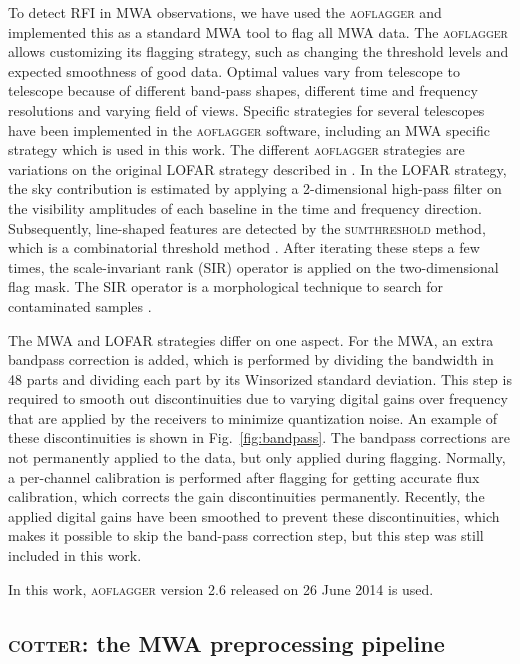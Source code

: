 \documentclass{pasa}
\begin{document}
To detect RFI in MWA observations, we have used the \textsc{aoflagger} and implemented this as a standard MWA tool to flag all MWA data. The \textsc{aoflagger} allows customizing its flagging strategy, such as changing the threshold levels and expected smoothness of good data. Optimal values vary from telescope to telescope because of different band-pass shapes, different time and frequency resolutions and varying field of views. Specific strategies for several telescopes have been implemented in the \textsc{aoflagger} software, including an MWA specific strategy which is used in this work. The different \textsc{aoflagger} strategies are variations on the original LOFAR strategy described in \citet{lofar-radio-environment}. In the LOFAR strategy, the sky contribution is estimated by applying a 2-dimensional high-pass filter on the visibility amplitudes of each baseline in the time and frequency direction. Subsequently, line-shaped features are detected by the \textsc{sumthreshold} method, which is a combinatorial threshold method \citep{post-correlation-rfi-classification}. After iterating these steps a few times, the scale-invariant rank (SIR) operator is applied on the two-dimensional flag mask. The SIR operator is a morphological technique to search for contaminated samples \citep{scale-invariant-rank-operator}.

The MWA and LOFAR strategies differ on one aspect. For the MWA, an extra bandpass correction is added, which is performed by dividing the bandwidth in 48 parts and dividing each part by its Winsorized standard deviation. This step is required to smooth out discontinuities due to varying digital gains over frequency that are applied by the receivers to minimize quantization noise. An example of these discontinuities is shown in Fig.~\ref{fig:bandpass}. The bandpass corrections are not permanently applied to the data, but only applied during flagging. Normally, a per-channel calibration is performed after flagging for getting accurate flux calibration, which corrects the gain discontinuities permanently. Recently, the applied digital gains have been smoothed to prevent these discontinuities, which makes it possible to skip the band-pass correction step, but this step was still included in this work. 

In this work, \textsc{aoflagger} version 2.6 released on 26 June 2014 is used.

\subsection{\textsc{cotter}: the MWA preprocessing pipeline}
\end{document}
